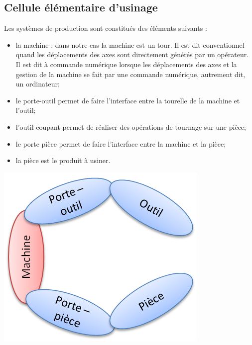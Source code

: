 \documentclass[11pt,oneside]{article}
\begin{document}
\subsection{Cellule élémentaire d'usinage}

\begin{minipage}[c]{.55\linewidth}
Les systèmes de production sont constitués des éléments suivants : 
\begin{itemize}
\item la machine : dans notre cas la machine est un tour. Il est dit conventionnel quand les déplacements des axes sont directement générés par un opérateur. Il est dit à commande numérique lorsque les déplacements des axes et la gestion de la machine se fait par une commande numérique, autrement dit, un ordinateur;
\item le porte-outil permet de faire l'interface entre la tourelle de la machine et l'outil; 
\item l'outil coupant permet de réaliser des opérations de tournage sur une pièce;
\item le porte pièce permet de faire l'interface entre la machine et la pièce;
\item la pièce est le produit à usiner. 
\end{itemize}
\end{minipage}\hfill
\begin{minipage}[c]{.4\linewidth}
\begin{center}
\includegraphics[width=.95\textwidth]{png/ceu}
\end{center}
\end{minipage}
\end{document}
